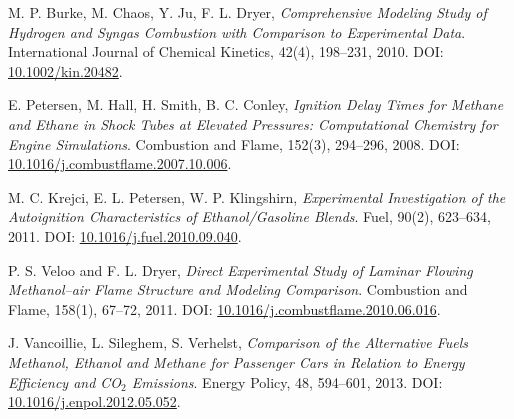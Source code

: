 \documentclass[12pt]{report}
\begin{document}
\begin{thebibliography}{9}
M. P. Burke, M. Chaos, Y. Ju, F. L. Dryer,
\textit{Comprehensive Modeling Study of Hydrogen and Syngas Combustion with Comparison to Experimental Data}. 
International Journal of Chemical Kinetics, 42(4), 198--231, 2010. DOI: \href{https://doi.org/10.1002/kin.20482}{10.1002/kin.20482}.

E. Petersen, M. Hall, H. Smith, B. C. Conley, 
\textit{Ignition Delay Times for Methane and Ethane in Shock Tubes at Elevated Pressures: Computational Chemistry for Engine Simulations}. 
Combustion and Flame, 152(3), 294--296, 2008. DOI: \href{https://doi.org/10.1016/j.combustflame.2007.10.006}{10.1016/j.combustflame.2007.10.006}.

M. C. Krejci, E. L. Petersen, W. P. Klingshirn, 
\textit{Experimental Investigation of the Autoignition Characteristics of Ethanol/Gasoline Blends}. 
Fuel, 90(2), 623--634, 2011. DOI: \href{https://doi.org/10.1016/j.fuel.2010.09.040}{10.1016/j.fuel.2010.09.040}.

P. S. Veloo and F. L. Dryer, 
\textit{Direct Experimental Study of Laminar Flowing Methanol–air Flame Structure and Modeling Comparison}. 
Combustion and Flame, 158(1), 67--72, 2011. DOI: \href{https://doi.org/10.1016/j.combustflame.2010.06.016}{10.1016/j.combustflame.2010.06.016}.

J. Vancoillie, L. Sileghem, S. Verhelst, 
\textit{Comparison of the Alternative Fuels Methanol, Ethanol and Methane for Passenger Cars in Relation to Energy Efficiency and CO$_2$ Emissions}. 
Energy Policy, 48, 594--601, 2013. DOI: \href{https://doi.org/10.1016/j.enpol.2012.05.052}{10.1016/j.enpol.2012.05.052}.

\end{thebibliography}
\end{document}
